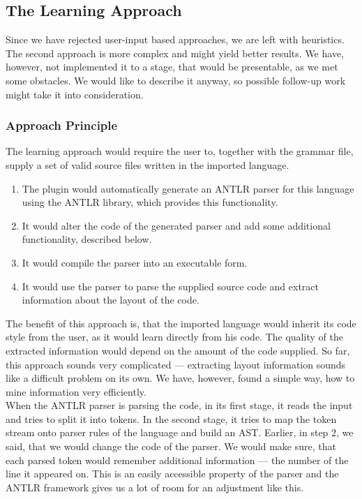 \subsection{The Learning Approach}
\label{chap:learning_approach}

Since we have rejected user-input based approaches, we are left with heuristics.
The second approach is more complex and might yield better results.
We have, however, not implemented it to a stage, that would be presentable, as we met some obstacles.
We would like to describe it anyway, so possible follow-up work might take it into consideration.
\\

\subsubsection{Approach Principle}

The learning approach would require the user to, together with the grammar file, supply a set of valid source files written in the imported language.

\begin{enumerate}
	\item The plugin would automatically generate an ANTLR parser for this language using the ANTLR library, which provides this functionality.

	\item It would alter the code of the generated parser and add some additional functionality, described below.

	\item It would compile the parser into an executable form.

	\item It would use the parser to parse the supplied source code and extract information about the layout of the code.
\end{enumerate}

The benefit of this approach is, that the imported language would inherit its code style from the user, as it would learn directly from his code.
The quality of the extracted information would depend on the amount of the code supplied.
So far, this approach sounds very complicated --- extracting layout information sounds like a difficult problem on its own.
We have, however, found a simple way, how to mine information very efficiently.
\\

When the ANTLR parser is parsing the code, in its first stage, it reads the input and tries to split it into tokens.
In the second stage, it tries to map the token stream onto parser rules of the language and build an AST.
Earlier, in step 2, we said, that we would change the code of the parser.
We would make sure, that each parsed token would remember additional information --- the number of the line it appeared on.
This is an easily accessible property of the parser and the ANTLR framework gives us a lot of room for an adjustment like this.
\\

